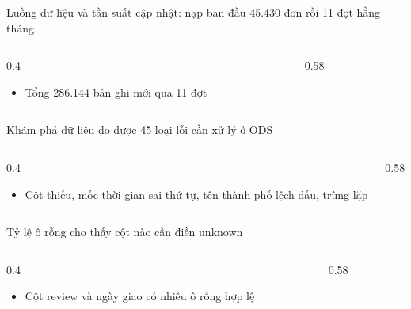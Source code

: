 \begin{frame}{Luồng dữ liệu và tần suất cập nhật: nạp ban đầu 45.430 đơn rồi 11 đợt hằng tháng}
\begin{columns}[T]\begin{column}{0.4\textwidth}
\begin{itemize}
  \item Tổng 286.144 bản ghi mới qua 11 đợt
\end{itemize}
\end{column}\begin{column}{0.58\textwidth}
\begin{center}\end{center}
\end{column}\end{columns}

\end{frame}

\begin{frame}{Khám phá dữ liệu đo được 45 loại lỗi cần xử lý ở ODS}
\begin{columns}[T]\begin{column}{0.4\textwidth}
\begin{itemize}
  \item Cột thiếu, mốc thời gian sai thứ tự, tên thành phố lệch dấu, trùng lặp
\end{itemize}
\end{column}\begin{column}{0.58\textwidth}
\begin{center}\end{center}
\end{column}\end{columns}

\end{frame}

\begin{frame}{Tỷ lệ ô rỗng cho thấy cột nào cần điền unknown}
\begin{columns}[T]\begin{column}{0.4\textwidth}
\begin{itemize}
  \item Cột review và ngày giao có nhiều ô rỗng hợp lệ
\end{itemize}
\end{column}\begin{column}{0.58\textwidth}
\begin{center}\end{center}
\end{column}\end{columns}

\end{frame}

